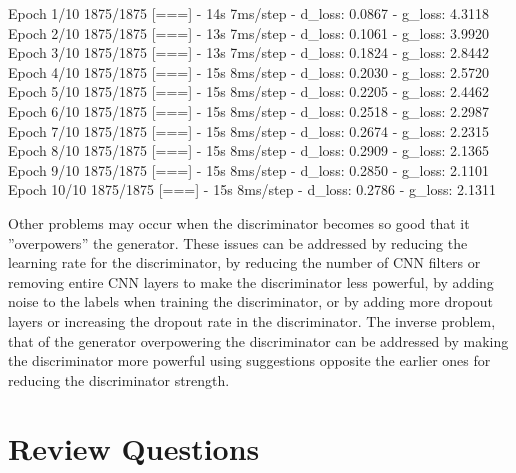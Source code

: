 \begin{textcode}
Epoch 1/10
1875/1875 [===] - 14s 7ms/step - d_loss: 0.0867 - g_loss: 4.3118
Epoch 2/10
1875/1875 [===] - 13s 7ms/step - d_loss: 0.1061 - g_loss: 3.9920
Epoch 3/10
1875/1875 [===] - 13s 7ms/step - d_loss: 0.1824 - g_loss: 2.8442
Epoch 4/10
1875/1875 [===] - 15s 8ms/step - d_loss: 0.2030 - g_loss: 2.5720
Epoch 5/10
1875/1875 [===] - 15s 8ms/step - d_loss: 0.2205 - g_loss: 2.4462
Epoch 6/10
1875/1875 [===] - 15s 8ms/step - d_loss: 0.2518 - g_loss: 2.2987
Epoch 7/10
1875/1875 [===] - 15s 8ms/step - d_loss: 0.2674 - g_loss: 2.2315
Epoch 8/10
1875/1875 [===] - 15s 8ms/step - d_loss: 0.2909 - g_loss: 2.1365
Epoch 9/10
1875/1875 [===] - 15s 8ms/step - d_loss: 0.2850 - g_loss: 2.1101
Epoch 10/10
1875/1875 [===] - 15s 8ms/step - d_loss: 0.2786 - g_loss: 2.1311
\end{textcode}

Other problems may occur when the discriminator becomes so good that it ''overpowers'' the generator. These issues can be addressed by reducing the learning rate for the discriminator, by reducing the number of CNN filters or removing entire CNN layers to make the discriminator less powerful, by adding noise to the labels when training the discriminator, or by adding more dropout layers or increasing the dropout rate in the discriminator. The inverse problem, that of the generator overpowering the discriminator can be addressed by making the discriminator more powerful using suggestions opposite the earlier ones for reducing the discriminator strength.

\FloatBarrier

\section{Review Questions}
